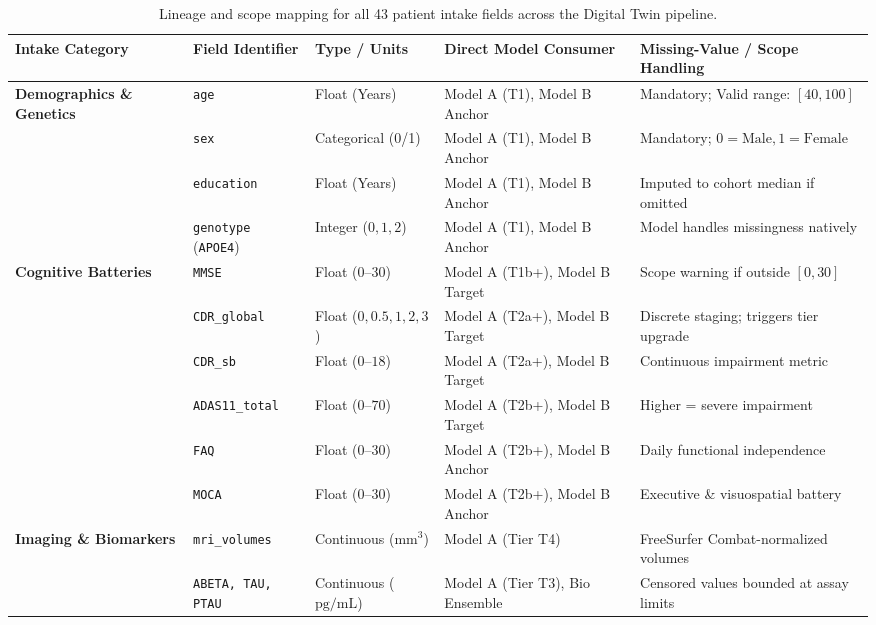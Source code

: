 \begin{table}[t]
\centering
\caption{Lineage and scope mapping for all 43 patient intake fields across the Digital Twin pipeline.}
\label{tab:intake_lineage_43}
\small
\begin{adjustbox}{max width=\linewidth}
\begin{tabular}{p{2.8cm}llp{4.5cm}p{4.2cm}}
\toprule
\textbf{Intake Category} & \textbf{Field Identifier} & \textbf{Type / Units} & \textbf{Direct Model Consumer} & \textbf{Missing-Value / Scope Handling} \\
\midrule
\multirow{4}{*}{\textbf{Demographics \& Genetics}} 
& \texttt{age} & Float (Years) & Model A (T1), Model B Anchor & Mandatory; Valid range: $[40, 100]$ \\
& \texttt{sex} & Categorical (0/1) & Model A (T1), Model B Anchor & Mandatory; $0 = \text{Male}, 1 = \text{Female}$ \\
& \texttt{education} & Float (Years) & Model A (T1), Model B Anchor & Imputed to cohort median if omitted \\
& \texttt{genotype} (\texttt{APOE4}) & Integer ($0, 1, 2$) & Model A (T1), Model B Anchor & Model handles missingness natively \\
\midrule
\multirow{6}{*}{\textbf{Cognitive Batteries}}
& \texttt{MMSE} & Float ($0$--$30$) & Model A (T1b+), Model B Target & Scope warning if outside $[0, 30]$ \\
& \texttt{CDR\_global} & Float ($0, 0.5, 1, 2, 3$) & Model A (T2a+), Model B Target & Discrete staging; triggers tier upgrade \\
& \texttt{CDR\_sb} & Float ($0$--$18$) & Model A (T2a+), Model B Target & Continuous impairment metric \\
& \texttt{ADAS11\_total} & Float ($0$--$70$) & Model A (T2b+), Model B Target & Higher = severe impairment \\
& \texttt{FAQ} & Float ($0$--$30$) & Model A (T2b+), Model B Anchor & Daily functional independence \\
& \texttt{MOCA} & Float ($0$--$30$) & Model A (T2b+), Model B Anchor & Executive \& visuospatial battery \\
\midrule
\multirow{2}{*}{\textbf{Imaging \& Biomarkers}}
& \texttt{mri\_volumes} & Continuous ($\text{mm}^3$) & Model A (Tier T4) & FreeSurfer Combat-normalized volumes \\
& \texttt{ABETA, TAU, PTAU} & Continuous ($\text{pg/mL}$) & Model A (Tier T3), Bio Ensemble & Censored values bounded at assay limits \\

\end{tabular}
\end{adjustbox}
\end{table}
